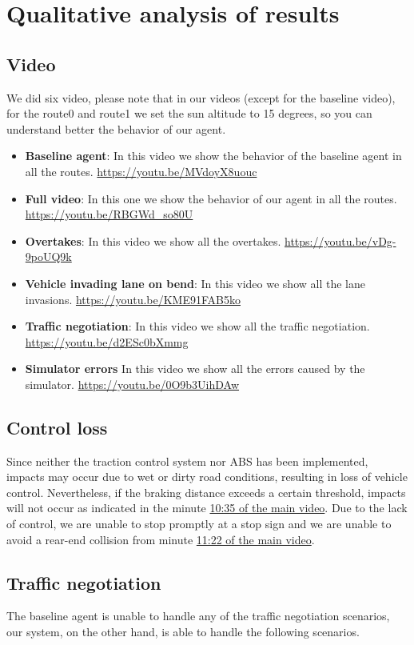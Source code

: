\documentclass{article}
\begin{document}
\section{Qualitative analysis of results}
\subsection{Video}
We did six video, please note that in our videos (except for the baseline video), for the route0 and route1 we set the sun altitude to 15 degrees,
so you can understand better the behavior of our agent.

\begin{itemize}
    \item \textbf{Baseline agent}: In this video we show the behavior of the baseline agent in all the routes. \url{https://youtu.be/MVdoyX8uouc}
    \item \textbf{Full video}: In this one we show the behavior of our agent in all the routes. \url{https://youtu.be/RBGWd_so80U}
    \item \textbf{Overtakes}: In this video we show all the overtakes. \url{https://youtu.be/vDg-9poUQ9k}
    \item \textbf{Vehicle invading lane on bend}: In this video we show all the lane invasions. \url{https://youtu.be/KME91FAB5ko}
    \item \textbf{Traffic negotiation}: In this video we show all the traffic negotiation. \url{https://youtu.be/d2ESc0bXmmg}
    \item \textbf{Simulator errors} In this video we show all the errors caused by the simulator. \url{https://youtu.be/0O9b3UihDAw}
\end{itemize}

\subsection{Control loss}\label{controlLoss}
Since neither the traction control system nor ABS has been implemented, impacts may occur due to wet or dirty road conditions,
resulting in loss of vehicle control. Nevertheless, if the braking distance exceeds a certain threshold, impacts will not occur as
indicated in the minute \href{https://youtu.be/RBGWd_so80U?t=635}{10:35 of the main video}. Due to the lack of control, we are unable to stop promptly at a stop sign and we are unable to avoid a rear-end collision from minute \href{https://youtu.be/RBGWd_so80U?t=682}{11:22 of the main video}.

\subsection{Traffic negotiation}
The baseline agent is unable to handle any of the traffic negotiation scenarios, our system, on the other hand, is able to handle the following scenarios.
\end{document}
